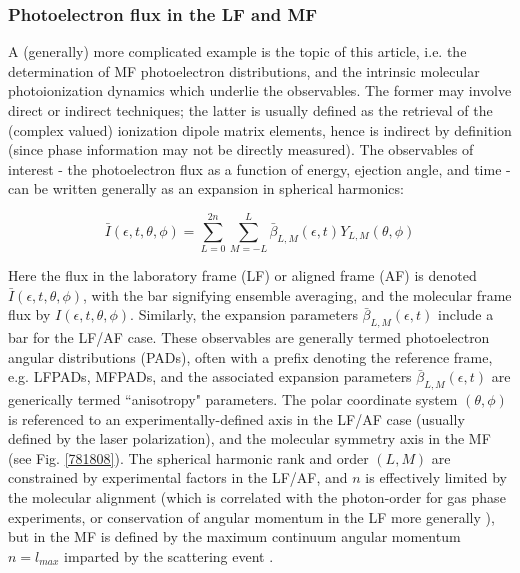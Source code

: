 \documentclass[10pt]{article}
\begin{document}
\subsubsection{Photoelectron flux in the LF and MF}

A (generally) more complicated example is the topic of this article, i.e. the determination of MF photoelectron distributions, and the intrinsic molecular photoionization dynamics which underlie the observables.  The former may involve direct or indirect techniques; the latter is usually defined as the retrieval of the (complex valued) ionization dipole matrix elements, hence is indirect by definition (since phase information may not be directly measured). The observables of interest - the photoelectron flux as a function of energy, ejection angle, and time - can be written generally as an expansion in spherical harmonics:

\begin{equation}
\bar{I}(\epsilon,t,\theta,\phi)=\sum_{L=0}^{2n}\sum_{M=-L}^{L}\bar{\beta}_{L,M}(\epsilon,t)Y_{L,M}(\theta,\phi)\label{eq:AF-PAD-general}
\end{equation}

Here the flux in the laboratory frame (LF) or aligned frame (AF) is denoted $\bar{I}(\epsilon,t,\theta,\phi)$, with the bar signifying ensemble averaging, and the molecular frame flux by $I(\epsilon,t,\theta,\phi)$.  Similarly, the expansion parameters $\bar{\beta}_{L,M}(\epsilon,t)$ include a bar for the LF/AF case. These observables are generally termed photoelectron angular distributions (PADs), often with a prefix denoting the reference frame, e.g. LFPADs, MFPADs, and the associated expansion parameters $\bar{\beta}_{L,M}(\epsilon,t)$ are generically termed ``anisotropy" parameters. The polar coordinate system $(\theta,\phi)$ is referenced to an experimentally-defined axis in the LF/AF case (usually defined by the laser polarization), and the molecular symmetry axis in the MF (see Fig. \ref{781808}). The spherical harmonic rank and order $(L,M)$ are constrained by experimental factors in the LF/AF, and $n$ is effectively limited by the molecular alignment (which is correlated with the photon-order for gas phase experiments, or conservation of angular momentum in the LF more generally \cite{Yang1948}), but in the MF is defined by the maximum continuum angular momentum $n=l_{max}$ imparted by the scattering event \cite{Dill1976}. 
\end{document}
